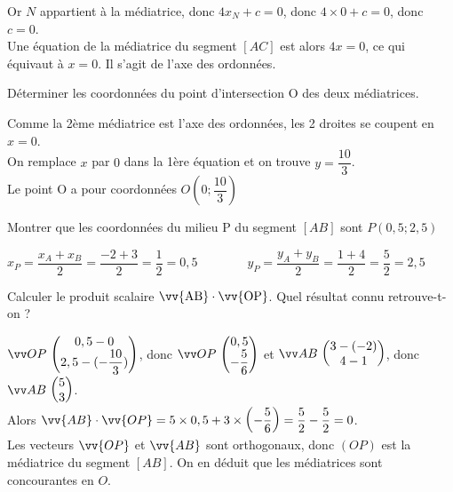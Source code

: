 \documentclass[12pt,a4paper]{article}  %
\begin{document}
\begin{enumMet}
\begin{corrBox}
		Or $N$ appartient à la médiatrice, donc $4x_{N}+c=0$, donc $4\times 0+c=0$, donc $c=0$.\\
		Une équation de la médiatrice du segment $[AC]$ est alors $4x=0$, ce qui équivaut à $x=0$. Il s'agit de l'axe des ordonnées.
	\end{corrBox}
	\item Déterminer les coordonnées du point d'intersection $\mathrm{O}$ des deux médiatrices.\\
	\begin{corrBox}
		Comme la 2ème médiatrice est l'axe des ordonnées, les 2 droites se coupent en $x=0$.\\
		On remplace $x$ par $0$ dans la 1ère équation et on trouve $y=\dfrac{10}{3}$.\\
		Le point O a pour coordonnées $O\left(0;\dfrac{10}{3}\right)$
	\end{corrBox}
	\item {} Montrer que les coordonnées du milieu P du segment $[AB]$ sont $P(0,5;2,5)$\\
	\begin{corrBox}
		$x_P=\dfrac{x_A+x_B}{2}=\dfrac{-2+3}{2}=\dfrac{1}{2}=0,5\quad \quad \quad \quad y_P=\dfrac{y_A+y_B}{2}=\dfrac{1+4}{2}=\dfrac{5}{2}=2,5$
	\end{corrBox}
	\item Calculer le produit scalaire $\vv{\mathrm{AB}} \cdot \vv{\mathrm{OP}}$. Quel résultat connu retrouve-t-on ?\\
	\begin{corrBox}
		$\Coord{OP}{0,5-0}{2,5-(-\dfrac{10}{3})}$, donc $\Coord{OP}{0,5}{-\dfrac{5}{6}}$ et $\Coord{AB}{3-(-2)}{4-1}$, donc $\Coord{AB}{5}{3}$.\\
		Alors $\vv{A B} \cdot \vv{OP}=5 \times 0,5+3 \times\left(-\dfrac{5}{6}\right)=\dfrac{5}{2}-\dfrac{5}{2}=0$.\\
		Les vecteurs $\vv{OP}$ et $\vv{AB}$ sont orthogonaux, donc $(OP)$ est la médiatrice du segment $[AB]$. On en déduit que les médiatrices sont concourantes en $O$.
	\end{corrBox}
	
\end{enumMet}
\end{document}
